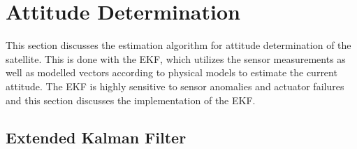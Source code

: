 \section{Attitude Determination}
This section discusses the estimation algorithm for attitude determination of the satellite. This is done with the EKF, which utilizes the sensor measurements as well as modelled vectors according to physical models to estimate the current attitude. The EKF is highly sensitive to sensor anomalies and actuator failures and this section discusses the implementation of the EKF.

\subsection{Extended Kalman Filter}

%
%

